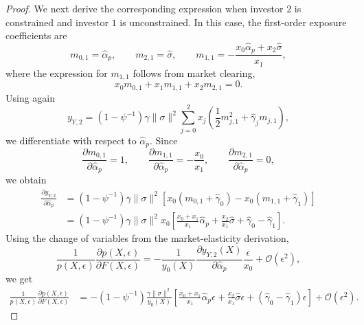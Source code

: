 \begin{proof}
\medskip

We next derive the corresponding expression when investor $2$ is constrained and investor $1$ is unconstrained.
In this case, the first-order exposure coefficients are
\begin{equation}
    m_{0,1}=\hat{\alpha}_p, \qquad
    m_{2,1}=\hat{\sigma}, \qquad
    m_{1,1}=-\frac{x_0\hat{\alpha}_p+x_2\hat{\sigma}}{x_1},
\end{equation}
where the expression for $m_{1,1}$ follows from market clearing,
\begin{equation}
    x_0m_{0,1}+x_1m_{1,1}+x_2m_{2,1}=0.
\end{equation}
Using again
\begin{equation}
    y_{Y,2}
    = (1-\psi^{-1})\gamma\|\sigma\|^2
    \sum_{j=0}^2 x_j\left(\frac{1}{2}m_{j,1}^2+\hat{\gamma}_j m_{j,1}\right),
\end{equation}
we differentiate with respect to $\hat{\alpha}_p$.
Since
\begin{equation}
    \frac{\partial m_{0,1}}{\partial \hat{\alpha}_p}=1, \qquad
    \frac{\partial m_{1,1}}{\partial \hat{\alpha}_p}=-\frac{x_0}{x_1}, \qquad
    \frac{\partial m_{2,1}}{\partial \hat{\alpha}_p}=0,
\end{equation}
we obtain
\begin{align}
    \frac{\partial y_{Y,2}}{\partial \hat{\alpha}_p}
    &= (1-\psi^{-1})\gamma\|\sigma\|^2
    \left[x_0(m_{0,1}+\hat{\gamma}_0)
    -x_0(m_{1,1}+\hat{\gamma}_1)\right] \nonumber\\
    &= (1-\psi^{-1})\gamma\|\sigma\|^2 x_0
    \left[
        \frac{x_0+x_1}{x_1}\hat{\alpha}_p
        +\frac{x_2}{x_1}\hat{\sigma}
        +\hat{\gamma}_0-\hat{\gamma}_1
    \right].
\end{align}
Using the change of variables from the market-elasticity derivation,
\begin{equation}
    \frac{1}{p(X,\epsilon)}\frac{\partial p(X,\epsilon)}{\partial F(X,\epsilon)}
    = -\frac{1}{y_0(X)}
    \frac{\partial y_{Y,2}(X)}{\partial \hat{\alpha}_p}
    \frac{\epsilon}{x_0}
    +\mathcal{O}(\epsilon^2),
\end{equation}
we get
\begin{align}
    \frac{1}{p(X,\epsilon)}\frac{\partial p(X,\epsilon)}{\partial F(X,\epsilon)}
    &= -(1-\psi^{-1})\frac{\gamma\|\sigma\|^2}{y_0(X)}
    \left[
        \frac{x_0+x_1}{x_1}\hat{\alpha}_p\epsilon
        +\frac{x_2}{x_1}\hat{\sigma}\epsilon
        +(\hat{\gamma}_0-\hat{\gamma}_1)\epsilon
    \right]
    +\mathcal{O}(\epsilon^2).

\end{align}
\end{proof}
